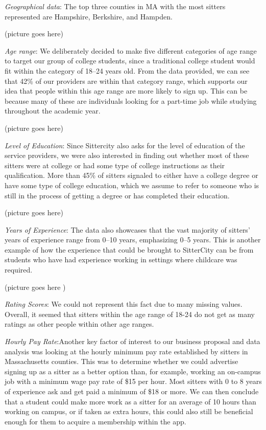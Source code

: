 \documentclass[12pt]{article}
\begin{document}
\emph{Geographical data}: The top three counties in MA with the most
sitters represented are Hampshire, Berkshire, and Hampden.

(picture goes here)

\emph{Age range}: We deliberately decided to make five different
categories of age range to target our group of college students, since a
traditional college student would fit within the category of 18--24
years old. From the data provided, we can see that 42\% of our providers
are within that category range, which supports our idea that people
within this age range are more likely to sign up. This can be because
many of these are individuals looking for a part-time job while studying
throughout the academic year.

(picture goes here)

\emph{Level of Education}: Since Sittercity also asks for the level of
education of the service providers, we were also interested in finding
out whether most of these sitters were at college or had some type of
college instructions as their qualification. More than 45\% of sitters
signaled to either have a college degree or have some type of college
education, which we assume to refer to someone who is still in the
process of getting a degree or has completed their education.

(picture goes here)

\emph{Years of Experience}: The data also showcases that the vast
majority of sitters' years of experience range from 0--10 years,
emphasizing 0--5 years. This is another example of how the experience
that could be brought to SitterCity can be from students who have had
experience working in settings where childcare was required.

(picture goes here )

\emph{Rating Scores}: We could not represent this fact due to many
missing values. Overall, it seemed that sitters within the age range of
18-24 do not get as many ratings as other people within other age
ranges.

\emph{Hourly Pay Rate}:Another key factor of interest to our business
proposal and data analysis was looking at the hourly minimum pay rate
established by sitters in Massachusetts counties. This was to determine
whether we could advertise signing up as a sitter as a better option
than, for example, working an on-campus job with a minimum wage pay rate
of \$15 per hour. Most sitters with 0 to 8 years of experience ask and
get paid a minimum of \$18 or more. We can then conclude that a student
could make more work as a sitter for an average of 10 hours than working
on campus, or if taken as extra hours, this could also still be
beneficial enough for them to acquire a membership within the app.
\end{document}
